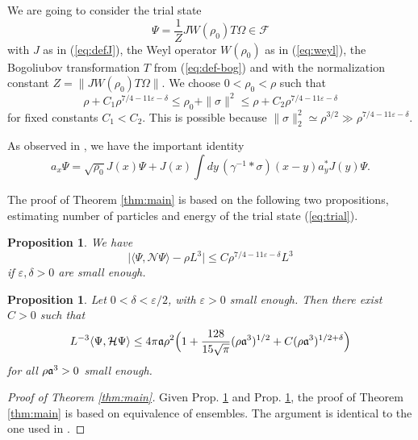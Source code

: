 \documentclass[a4paper,11pt]{article}
\def\cF{\mathcal{F}}
\def\eps{\varepsilon}
\newtheorem{proposition}[theorem]{Proposition}
\numberwithin{equation}{section}
\def\aa{\mathfrak{a}}
\begin{document}
We are going to consider the trial state 
\begin{equation}\label{eq:trial} \Psi = \frac{1}{Z} J W(\rho_0) T \Omega \in \cF \end{equation}
with $J$ as in (\ref{eq:defJ}), the Weyl operator $W(\rho_0)$ as in (\ref{eq:weyl}), the Bogoliubov transformation $T$ from (\ref{eq:def-bog}) and with the normalization constant $Z = \| J W(\rho_0) T \Omega \|$. We choose $0 < \rho_0 < \rho$ such that 
\begin{equation}\label{eq:choice} \rho+ C _1 \rho^{7/4-11\eps-\delta} \leq \rho_0 + \| \sigma \|^2 \leq \rho + C_2 \rho^{7/4-11\eps-\delta} \end{equation} 
for fixed constants $C_1 < C_2$. This is possible because  $\| \sigma \|_2^2 \simeq \rho^{3/2} \gg \rho^{7/4-11\eps-\delta}$.

As observed in \cite[Lemma 2.3]{BBCOS}, we have the important identity 
\begin{equation}\label{eq:id} a_x \Psi = \sqrt{\rho_0}J(x)\Psi+J(x)\int dy\,(\gamma^{-1} * \sigma)(x-y)a^*_y J(y)\Psi.
\end{equation}

The proof of Theorem \ref{thm:main} is based on the following two propositions, estimating number of particles and energy of the trial state (\ref{eq:trial}). 
\begin{proposition} \label{prop:N_on_psi}
	We have 
	\begin{equation} \label{eq:cN_ub}
		\big| \langle \Psi,\mathcal{N}\Psi\rangle - \rho L^3 \big| \leq C \rho^{7/4-11\eps-\delta} L^3
	\end{equation}    
	if $\eps , \delta > 0$ are small enough.  	
\end{proposition}

\begin{proposition} \label{prop:Psi-energy} 
Let $0 < \delta < \eps/2$, with $\eps > 0$ small enough. Then there exist $C>0$ such that
	\begin{equation} \label{eq:Hpsi0}
		L^{-3} \langle \Psi,\mathcal{H} \Psi\rangle \leq 4 \pi \frak{a} \rho^2 \Big(1 + \frac{128}{15\sqrt{\pi}} (\rho \frak{a}^3)^{1/2} + C (\rho \frak{a}^3)^{1/2+\delta} \Big) 
	\end{equation}
	for all $\rho \frak{a}^3 > 0$ small enough. 
\end{proposition}

\begin{proof}[Proof of Theorem \ref{thm:main}]
Given Prop. \ref{prop:N_on_psi} and Prop. \ref{prop:Psi-energy}, the proof of Theorem \ref{thm:main} is based on equivalence of ensembles. The argument is identical to the one used in \cite{BBCOS}. 
\end{proof}
\end{document}
